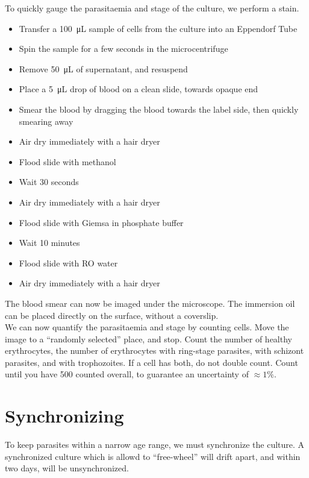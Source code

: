 \documentclass{article}
\begin{document}
To quickly gauge the parasitaemia and stage of the culture, we perform a stain.

\begin{itemize}
	\item Transfer a \SI{100}{\micro L} sample of cells from the culture into an Eppendorf Tube
	\item Spin the sample for a few seconds in the microcentrifuge
	\item Remove \SI{50}{\micro L} of supernatant, and resuspend
	\item Place a \SI{5}{\micro L} drop of blood on a clean slide, towards opaque end
	\item Smear the blood by dragging the blood towards the label side, then quickly smearing away 
	\item Air dry immediately with a hair dryer
	\item Flood slide with methanol
	\item Wait 30 seconds
	\item Air dry immediately with a hair dryer
	\item Flood slide with Giemsa in phosphate buffer
	\item Wait 10 minutes
	\item Flood slide with RO water
	\item Air dry immediately with a hair dryer
\end{itemize}

The blood smear can now be imaged under the microscope. The immersion oil can be placed directly on the surface, without a coverslip.\\

We can now quantify the parasitaemia and stage by counting cells. Move the image to a ``randomly selected'' place, and stop. Count the number of healthy erythrocytes, the number of erythrocytes with ring-stage parasites, with schizont parasites, and with trophozoites. If a cell has both, do not double count. Count until you have 500 counted overall, to guarantee an uncertainty of $\approx 1\%$.

\newpage
\section{Synchronizing}

To keep parasites within a narrow age range, we must synchronize the culture. A synchronized culture which is allowd to ``free-wheel'' will drift apart, and within two days, will be unsynchronized.\\
\end{document}
